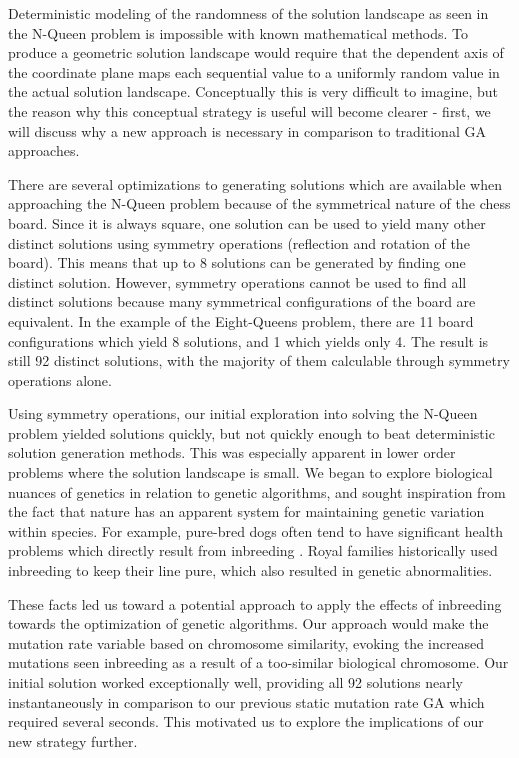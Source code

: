 \documentclass[conference]{IEEEtran}
\begin{document}
Deterministic modeling of the randomness of the solution landscape as seen in the N-Queen problem is impossible with known mathematical methods. To produce a geometric solution landscape would require that the dependent axis of the coordinate plane maps each sequential value to a uniformly random value in the actual solution landscape. Conceptually this is very difficult to imagine, but the reason why this conceptual strategy is useful will become clearer - first, we will discuss why a new approach is necessary in comparison to traditional GA approaches.

There are several optimizations to generating solutions which are available when approaching the N-Queen problem because of the symmetrical nature of the chess board. Since it is always square, one solution can be used to yield many other distinct solutions using symmetry operations (reflection and rotation of the board). This means that up to 8 solutions can be generated by finding one distinct solution. However, symmetry operations cannot be used to find all distinct solutions because many symmetrical configurations of the board are equivalent. In the example of the Eight-Queens problem, there are 11 board configurations which yield 8 solutions, and 1 which yields only 4. The result is still 92 distinct solutions, with the majority of them calculable through symmetry operations alone.

Using symmetry operations, our initial exploration into solving the N-Queen problem yielded solutions quickly, but not quickly enough to beat deterministic solution generation methods. This was especially apparent in lower order problems where the solution landscape is small. We began to explore biological nuances of genetics in relation to genetic algorithms, and sought inspiration from the fact that nature has an apparent system for maintaining genetic variation within species. For example, pure-bred dogs often tend to have significant health problems which directly result from inbreeding \cite{clark1983medical}. Royal families historically used inbreeding to keep their line pure, which also resulted in genetic abnormalities\cite{mannucci2001hemophilias}.

These facts led us toward a potential approach to apply the effects of inbreeding towards the optimization of genetic algorithms. Our approach would make the mutation rate variable based on chromosome similarity, evoking the increased mutations seen inbreeding as a result of a too-similar biological chromosome. Our initial solution worked exceptionally well, providing all 92 solutions nearly instantaneously in comparison to our previous static mutation rate GA which required several seconds. This motivated us to explore the implications of our new strategy further.
\end{document}
